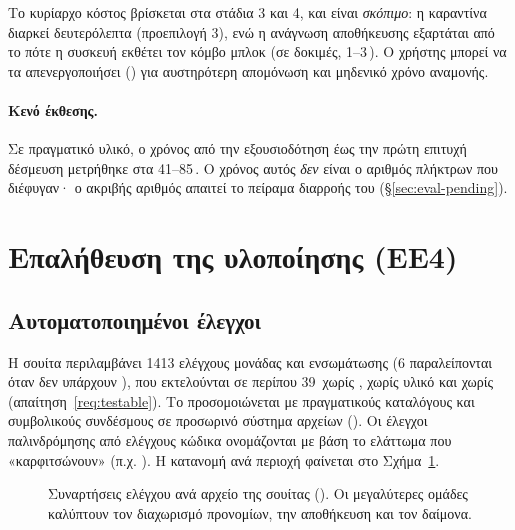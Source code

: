 Το κυρίαρχο κόστος βρίσκεται στα στάδια 3 και 4, και είναι \emph{σκόπιμο}: η
καραντίνα διαρκεί  δευτερόλεπτα (προεπιλογή 3), ενώ η ανάγνωση
αποθήκευσης εξαρτάται από το πότε η συσκευή εκθέτει τον κόμβο μπλοκ (σε δοκιμές,
1–3\,). Ο χρήστης μπορεί να τα απενεργοποιήσει
() για αυστηρότερη απομόνωση και μηδενικό
χρόνο αναμονής.

\paragraph{Κενό έκθεσης.} Σε πραγματικό υλικό, ο χρόνος από την εξουσιοδότηση
έως την πρώτη επιτυχή δέσμευση  μετρήθηκε στα
41–85\,. Ο χρόνος αυτός \emph{δεν} είναι ο αριθμός πλήκτρων που
διέφυγαν· ο ακριβής αριθμός απαιτεί το πείραμα διαρροής του
 (§\ref{sec:eval-pending}).

\section{Επαλήθευση της υλοποίησης (ΕΕ4)}
\label{sec:eval-verification}

\subsection{Αυτοματοποιημένοι έλεγχοι}

Η σουίτα περιλαμβάνει 1413 ελέγχους μονάδας και ενσωμάτωσης (6 παραλείπονται
όταν δεν υπάρχουν ), που εκτελούνται σε περίπου 39\,
χωρίς , χωρίς υλικό και χωρίς  (απαίτηση~\ref{req:testable}).
Το  προσομοιώνεται με πραγματικούς καταλόγους και συμβολικούς
συνδέσμους σε προσωρινό σύστημα αρχείων (). Οι έλεγχοι
παλινδρόμησης από ελέγχους κώδικα ονομάζονται με βάση το ελάττωμα που
«καρφιτσώνουν» (π.χ. ). Η κατανομή ανά
περιοχή φαίνεται στο Σχήμα~\ref{fig:tests}.

\begin{figure}[htbp]
\centering
{}
\caption{Συναρτήσεις ελέγχου ανά αρχείο της σουίτας ().
Οι μεγαλύτερες ομάδες καλύπτουν τον διαχωρισμό προνομίων, την αποθήκευση και
τον δαίμονα.}
\label{fig:tests}
\end{figure}


